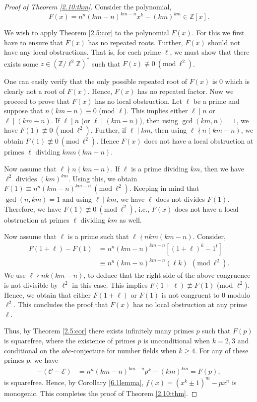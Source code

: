 \documentclass[table]{amsart}
\newcommand{\Mod}[1]{\ (\mathrm{mod}\ #1)} %
\newcommand{\Z}{\mathbb{Z}}
\newcommand{\calC}{\mathcal{C}}
\newcommand{\calE}{\mathcal{E}}
\numberwithin{equation}{section}
\begin{document}
\begin{proof}[Proof of Theorem \ref{2.10:thm}]
    Consider the polynomial, 
    $$ F(x) = n^n (km-n)^{km-n} x^k - (km)^{km} \in \Z[x]. $$
    
    We wish to apply Theorem \ref{2.5:cor} to the polynomial $F(x)$. For this we first have to ensure that $F(x)$ has no repeated roots. Further, $F(x)$ should not have any local obstructions. That is, for each prime $\ell$, we must show that there exists some $z \in (\Z/\ell^2\Z)^*$ such that $F(z) \not\equiv 0 \Mod{\ell^2}$.
		
    One can easily verify that the only possible repeated root of $F(x)$ is $0$ which is clearly not a root of $F(x)$. Hence, $F(x)$ has no repeated factor. Now we proceed to prove that $F(x)$ has no local obstruction. Let $\ell$ be a prime and suppose that $ n(km-n) \equiv 0$ (mod $\ell$). This implies either $\ell \mid n$ or $\ell \mid (km-n)$. If $\ell \mid n$ (or $\ell \mid (km-n)$), then using $\gcd(km, n)=1$, we have $F(1)\not\equiv 0 \Mod{\ell^2}$. Further, if $\ell\mid km$, then using $\ell\nmid n(km-n)$, we obtain $F(1)\not\equiv 0 \Mod{\ell^2}$. Hence $F(x)$ does not have a local obstruction at primes $\ell$ dividing $kmn(km-n)$.
		
    Now assume that $\ell \nmid n(km-n)$. If $\ell$ is a prime dividing $km$, then we have $\ell^2$ divides $(km)^{km}$. Using this, we obtain $F(1) \equiv n^n (km-n)^{km-n}\Mod{\ell^2}$. Keeping in mind that $\gcd(n,km)=1$ and using $\ell \mid km$, we have $\ell$ does not divides $F(1)$. Therefore, we have $F(1) \not \equiv 0 \Mod{\ell^2}$, i.e., $F(x)$ does not have a local obstruction at primes $\ell$ dividing $km$ as well. %
    
    Now assume that $\ell$ is a prime such that $\ell \nmid nkm(km-n)$. Consider,
    \begin{align*}
        F(1+\ell) - F(1) &= n^n (km-n)^{km-n} [ (1+\ell)^k - 1^t] \\
	&\equiv n^n (km-n)^{km-n} (\ell k)~ \Mod{\ell^2}.
    \end{align*}
    We use $\ell \nmid nk(km-n)$, to deduce that the right side of the above congruence is not divisible by $\ell^2$ in this case. This implies $F(1+\ell) \not\equiv F(1)$ (mod $\ell^2$). Hence, we obtain that either $F(1+\ell)$ or $F(1)$ is not congruent to $0$ modulo $\ell^2$. This concludes the proof that $F(x)$ has no local obstruction at any prime $\ell$.
		
    Thus, by Theorem \ref{2.5:cor} there exists infinitely many primes $p$ such that $F(p)$ is squarefree, where the existence of primes $p$ is unconditional when $k=2,3$ and conditional on the $abc$-conjecture for number fields when $k \geq 4$. For any of these primes $p$, we have
    \begin{align*}
        -(\calC-\calE) &= n^n (km-n)^{km-n} p^k - (km)^{km} = F(p),
    \end{align*}
    is squarefree. Hence, by Corollary \ref{6.1lemma}, $f(x)= (x^k \pm 1)^m - px^n$ is monogenic. This completes the proof of Theorem \ref{2.10:thm}.
\end{proof}
\end{document}
